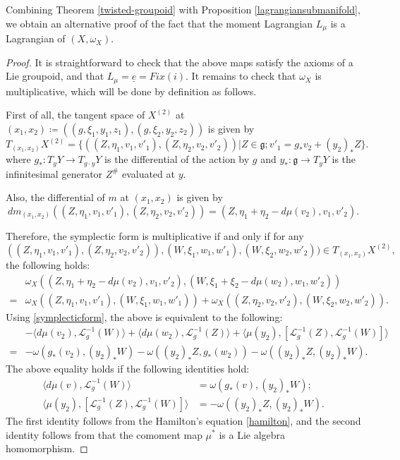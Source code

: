 \documentclass[10pt,a4paper]{amsart}
\begin{document}
\begin{remark}
Combining Theorem \ref{twisted-groupoid} with Proposition \ref{lagrangiansubmanifold}, we obtain an alternative proof of the fact that the moment Lagrangian $L_\mu$ is a Lagrangian of $(X, \omega_X)$.
\end{remark}

\begin{proof}
It is straightforward to check that the above maps satisfy the axioms of a Lie groupoid, and that $L_\mu = \underline{e} = Fix(i)$. It remains to check that $\omega_X$ is multiplicative, which will be done by definition as follows.

    First of all, the tangent space of $X^{(2)}$ at $(x_1, x_2) \coloneqq ((g, \xi_1, y_1, z_1), (g, \xi_2, y_2, z_2))$ is given by 
    $$T_{(x_1, x_2)}X^{(2)} = \{((Z, \eta_1, v_1, v'_1), (Z, \eta_2, v_2, v'_2))| Z\in \mathfrak{g}; v'_1 = g_* v_2 + (y_2)_* Z\}.$$
    where $g_*: T_{y}Y \rightarrow T_{g\cdot y}Y$ is the differential of the action by $g$ and $y_*: \mathfrak{g} \rightarrow T_{y}Y$ is the infinitesimal generator $Z^\#$ evaluated at $y$.

    Also, the differential of $m$ at $(x_1, x_2)$ is given by
 $$dm_{(x_1, x_2)}((Z, \eta_1, v_1, v'_1), (Z, \eta_2, v_2, v'_2))=(Z, \eta_1 + \eta_2 - d\mu(v_2), v_1, v'_2).$$

    Therefore, the symplectic form is multiplicative if and only if for any 
    $$((Z, \eta_1, v_1, v'_1), (Z, \eta_2, v_2, v'_2)), (W, \xi_1, w_1, w'_1), (W, \xi_2, w_2, w'_2))\in T_{(x_1, x_2)}X^{(2)},$$
    the following holds:
\begin{align*}
    &\omega_X((Z, \eta_1 + \eta_2 - d\mu(v_2), v_1, v'_2), (W, \xi_1 + \xi_2 - d\mu(w_2), w_1, w'_2))\\
    = &\omega_X((Z, \eta_1, v_1, v'_1), (W, \xi_1, w_1, w'_1)) + \omega_X((Z, \eta_2, v_2, v'_2), (W, \xi_2, w_2, w'_2)).
\end{align*}
Using \ref{symplecticform}, the above is equivalent to the following:
\begin{align*}
&-\langle d\mu(v_2), \mathcal{L}^{-1}_{g}(W) \rangle + \langle d\mu(w_2), \mathcal{L}^{-1}_{g}(Z) \rangle + \langle \mu(y_2), [\mathcal{L}^{-1}_{g}(Z), \mathcal{L}^{-1}_{g}(W)] \rangle \\
= &-\omega(g_*(v_2), (y_2)_*W) - \omega((y_2)_*Z, g_*(w_2)) - \omega((y_2)_*Z, (y_2)_*W).
\end{align*}
The above equality holds if the following identities hold:
\begin{align*}
\langle d\mu(v), \mathcal{L}^{-1}_{g}(W) \rangle &= \omega(g_*(v), (y_2)_*W);\\
\langle \mu(y_2), [\mathcal{L}^{-1}_{g}(Z), \mathcal{L}^{-1}_{g}(W)] \rangle &= - \omega((y_2)_*Z, (y_2)_*W).
\end{align*}
The first identity follows from the Hamilton's equation \ref{hamilton}, and the second identity follows from that the comoment map $\mu^*$ is a Lie algebra homomorphism.
\end{proof}
\end{document}
